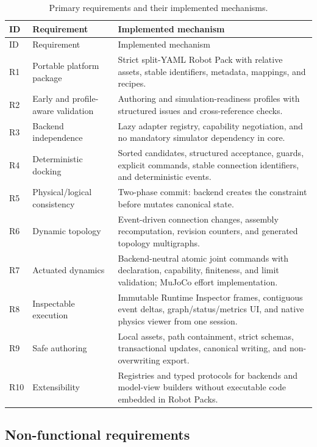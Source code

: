 \begin{longtable}{L{0.10\textwidth}L{0.31\textwidth}L{0.47\textwidth}}
\caption{Primary requirements and their implemented mechanisms.}
\label{tab:requirements}\\
\toprule
ID & Requirement & Implemented mechanism \\
\midrule
\endfirsthead
\toprule
ID & Requirement & Implemented mechanism \\
\midrule
\endhead
R1 & Portable platform package & Strict split-YAML Robot Pack with relative assets,
stable identifiers, metadata, mappings, and recipes. \\
R2 & Early and profile-aware validation & Authoring and simulation-readiness profiles
with structured issues and cross-reference checks. \\
R3 & Backend independence & Lazy adapter registry, capability negotiation, and no
mandatory simulator dependency in core. \\
R4 & Deterministic docking & Sorted candidates, structured acceptance, guards,
explicit commands, stable connection identifiers, and deterministic events. \\
R5 & Physical/logical consistency & Two-phase commit: backend creates the constraint
before  mutates canonical state. \\
R6 & Dynamic topology & Event-driven connection changes, assembly recomputation,
revision counters, and generated topology multigraphs. \\
R7 & Actuated dynamics & Backend-neutral atomic joint commands with declaration,
capability, finiteness, and limit validation; MuJoCo effort implementation. \\
R8 & Inspectable execution & Immutable Runtime Inspector frames, contiguous event
deltas, graph/status/metrics UI, and native physics viewer from one session. \\
R9 & Safe authoring & Local assets, path containment, strict schemas, transactional
updates, canonical writing, and non-overwriting export. \\
R10 & Extensibility & Registries and typed protocols for backends and model-view
builders without executable code embedded in Robot Packs. \\
\bottomrule
\end{longtable}

\subsection{Non-functional requirements}

